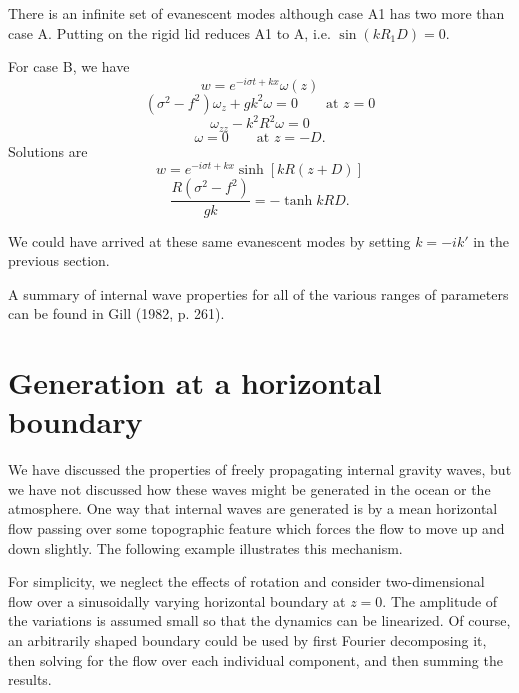\sourcepagebreak


There is an infinite set of evanescent modes although case A1 has two more than case
A. Putting on the rigid lid reduces A1 to A, i.e. $\sin(kR_1D)=0$.

For case B, we have
\[
	w=e^{-i\sigma t+kx}\omega(z)
\]
\[
	(\sigma^2-f^2)\omega_z+gk^2\omega=0\qquad\text{at }z=0
\]
\[
	\omega_{zz}-k^2R^2\omega=0
\]
\[
	\omega=0\qquad\text{at }z=-D.
\]
Solutions are
\[
	w=e^{-i\sigma t+kx}\sinh[kR(z+D)]
\]
\[
	\frac{R(\sigma^2-f^2)}{gk}=-\tanh kRD.
\]

\sourcepagebreak


We could have arrived at these same evanescent modes by setting $k=-ik'$ in the
previous section.

A summary of internal wave properties for all of the various ranges of
parameters can be found in Gill (1982, p. 261).

\section{Generation at a horizontal boundary}

We have discussed the properties of freely propagating internal gravity waves, but we
have not discussed how these waves might be generated in the ocean or the
atmosphere. One way that internal waves are generated is by a mean horizontal flow
passing over some topographic feature which forces the flow to move up and down
slightly. The following example illustrates this mechanism.

For simplicity, we neglect the effects of rotation and consider two-dimensional
flow over a sinusoidally varying horizontal boundary at $z=0$. The amplitude of the
variations is assumed small so that the dynamics can be linearized. Of course, an
arbitrarily shaped boundary could be used by first Fourier decomposing it, then
solving for the flow over each individual component, and then summing the results.

